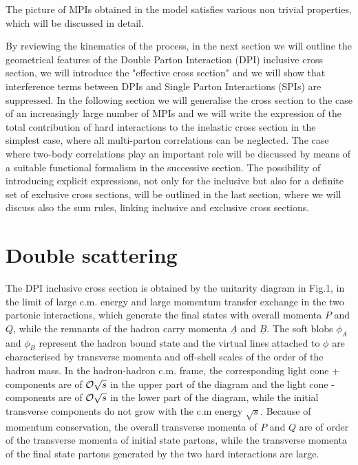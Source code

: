 \documentclass{ws-rv9x6}
\begin{document}
The picture of MPIs obtained in the model satisfies various non trivial properties, which will be discussed in detail.

By reviewing the kinematics of the process, in the next section we will outline the geometrical features of the Double Parton Interaction (DPI) inclusive cross section, we will introduce the "effective cross section" and we will show that interference terms between DPIs and Single Parton Interactions (SPIs) are suppressed. In the following section we will generalise the cross section to the case of an increasingly large number of MPIs and we will write the expression of the total contribution of hard interactions to the inelastic cross section in the simplest case, where all multi-parton correlations can be neglected. The case where two-body correlations play an important role will be discussed by means of a suitable functional formalism in the successive section. The possibility of introducing explicit expressions, not only for the inclusive but also for a definite set of exclusive cross sections, will be outlined in the last section, where we will discuss also the sum rules, linking inclusive and exclusive cross sections. 

\section{Double scattering}

The DPI inclusive cross section is obtained by the unitarity diagram in Fig.1, in the limit of large c.m. energy and large momentum transfer exchange in the two partonic interactions, which generate the final states with overall momenta $P$ and $Q$\cite{Paver:1982yp}, while the remnants of the hadron carry momenta $\underline{A}$ and $\underline{B}$. The soft blobs $\phi_A$ and $\phi_B$ represent the hadron bound state and the virtual lines attached to $\phi$ are characterised by transverse momenta and  off-shell scales of the order of the hadron mass. In the hadron-hadron c.m. frame, the corresponding light cone + components are of ${\cal O}\sqrt s$ in the upper part of the diagram and the light cone - components are of ${\cal O}\sqrt s$ in the lower part of the diagram, while the initial transverse components do not grow with the c.m energy $\sqrt s$. Because of momentum conservation, the overall transverse momenta of $P$ and $Q$ are of order of the transverse momenta of initial state partons, while the transverse momenta of the final state partons generated by the two hard interactions are large.
\end{document}
